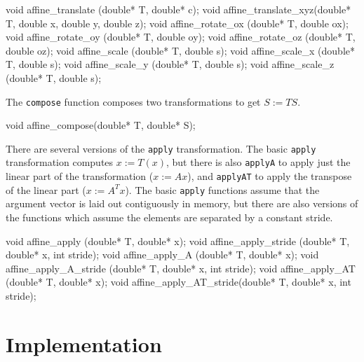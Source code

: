 \nwenddocs{}\plusendmoddef
void affine_translate    (double* T, double* c);
void affine_translate_xyz(double* T, double x, double y, double z);
void affine_rotate_ox    (double* T, double ox);
void affine_rotate_oy    (double* T, double oy);
void affine_rotate_oz    (double* T, double oz);
void affine_scale        (double* T, double s);
void affine_scale_x      (double* T, double s);
void affine_scale_y      (double* T, double s);
void affine_scale_z      (double* T, double s);
\nwendcode{}\nwdocspar

The {\tt{}compose} function composes two transformations
to get $S := TS$.

\nwenddocs{}\plusendmoddef
void affine_compose(double* T, double* S);

\nwendcode{}\nwdocspar

There are several versions of the {\tt{}apply} transformation.
The basic {\tt{}apply} transformation computes $x := T(x)$,
but there is also {\tt{}apply{}A} to apply just the linear
part of the transformation ($x := Ax$), and {\tt{}apply{}AT}
to apply the transpose of the linear part ($x := A^T x$).
The basic {\tt{}apply} functions assume that the argument vector
is laid out contiguously in memory, but there are also
versions of the functions which assume the elements are
separated by a constant stride.

\nwenddocs{}\plusendmoddef
void affine_apply          (double* T, double* x);
void affine_apply_stride   (double* T, double* x, int stride);
void affine_apply_A        (double* T, double* x);
void affine_apply_A_stride (double* T, double* x, int stride);
void affine_apply_AT       (double* T, double* x);
void affine_apply_AT_stride(double* T, double* x, int stride);

\nwendcode{}\nwdocspar

\section{Implementation}

